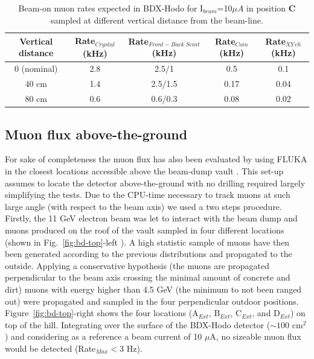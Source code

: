 \begin{table}[htp]
\caption{Beam-on muon rates expected in BDX-Hodo for I$_{beam}$=10$\mu A$ in position {\bf C} sampled at different vertical distance from the beam-line.}
\begin{center}
\begin{tabular}{|c|c|c|c|c|}
\hline
Vertical distance  & Rate$_{Crystal}$  (kHz)&  Rate$_{Front-Back \;Scint} $(kHz) & Rate$_{Coin}$ (kHz) & Rate$_{XY\, ch} $(kHz)\\
\hline\hline
0 (nominal)  & 2.8  &2.5/1    & 0.5 &0.1 \\
 \hline
40 cm & 1.4 &  2.5/1.5 & 0.17 & 0.04 \\
 \hline
80 cm&  0.6  & 0.6/0.3    &  0.08 & 0.02 \\
\hline\hline
\end{tabular}
\end{center}
\label{tab:rate-height}
\end{table}


\subsection{Muon flux above-the-ground}
For sake of completeness the muon flux has also been evaluated by using FLUKA in the closest locations accessible above the  beam-dump vault .  This set-up assumes to locate the detector above-the-ground with no drilling required  largely  simplifying the tests.
Due to the CPU-time necessary to track muons at such large angle (with respect to the beam axis) we used a two steps procedure. Firstly, the 11 GeV electron beam was let to interact with the beam dump and muons produced on the roof of the vault sampled in four  different locations (shown in  Fig.~\ref{fig:bd-top}-left ).
A high statistic sample of muons have then been generated according to the previous distributions and propagated to the outside.  Applying  a conservative hypothesis (the muons are propagated perpendicular to the beam axis  crossing the minimal amount of concrete and dirt) muons with energy higher than 4.5 GeV (the minimum to not been ranged out)  were propagated and sampled in the four  perpendicular outdoor positions. Figure~\ref{fig:bd-top}-right shows the four locations (A$_{Ext}$, B$_{Ext}$, C$_{Ext}$,  and D$_{Ext}$) on top of the hill. Integrating  over the surface of the BDX-Hodo detector ($\sim 100$ cm$^2$) and considering as a reference a beam current of 10 $\mu$A, no sizeable muon flux would be detected (Rate$_{Max}<$3 Hz).

